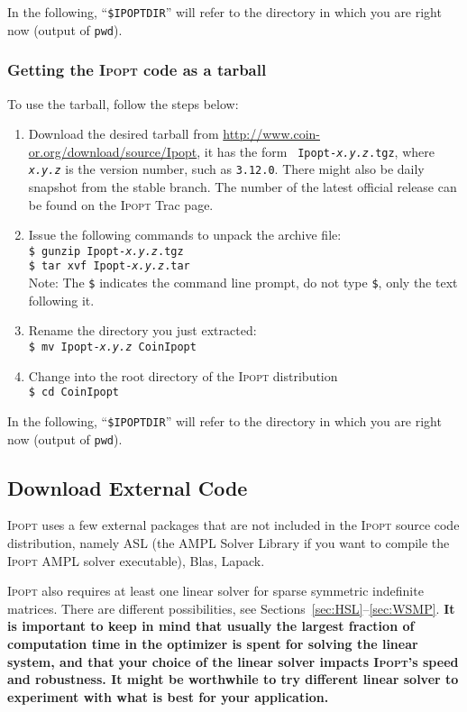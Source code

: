 \documentclass[10pt]{article}
\newcommand{\Ipopt}{\textsc{Ipopt}\xspace}
\begin{document}
In the following, ``\texttt{\$IPOPTDIR}'' will refer to the directory in
which you are right now (output of \texttt{pwd}).

\subsubsection{Getting the \Ipopt code as a tarball}

To use the tarball, follow the steps below:
\begin{enumerate}
\item Download the desired tarball from
  \url{http://www.coin-or.org/download/source/Ipopt}, it has the form {\tt
    Ipopt-{\em x.y.z}.tgz}, where {\tt\em x.y.z} is the version
  number, such as {\tt 3.12.0}.  There might also be daily snapshot
  from the stable branch.  The number of the latest official release
  can be found on the \Ipopt Trac page.
\item Issue the following commands to unpack the archive file: \\
\texttt{\$ gunzip Ipopt-{\em x.y.z}.tgz} \\
\texttt{\$ tar xvf Ipopt-{\em x.y.z}.tar} \\
Note: The {\tt \$} indicates the command line
prompt, do not type {\tt \$}, only the text following it.
\item Rename the directory you just extracted:\\
\texttt{\$ mv Ipopt-{\em x.y.z} CoinIpopt}
\item Change into the root directory of the \Ipopt distribution\\
{\tt \$ cd CoinIpopt}
\end{enumerate}

In the following, ``\texttt{\$IPOPTDIR}'' will refer to the directory in
which you are right now (output of \texttt{pwd}).

\subsection{Download External Code}\label{ExternalCode}
\Ipopt uses a few external packages that are not included in the
\Ipopt source code distribution, namely ASL (the AMPL Solver Library
if you want to compile the \Ipopt AMPL solver executable), Blas,
Lapack.

\Ipopt also requires at least one linear solver for sparse symmetric
indefinite matrices. There are
different possibilities, see Sections~\ref{sec:HSL}--\ref{sec:WSMP}.
{\bf It is important to keep in mind that usually
the largest fraction of computation time in the optimizer is spent for
solving the linear system, and that your choice of the linear solver
impacts \Ipopt's speed and robustness.  It might be worthwhile to try
different linear solver to experiment with what is best for your
application.}
\end{document}
